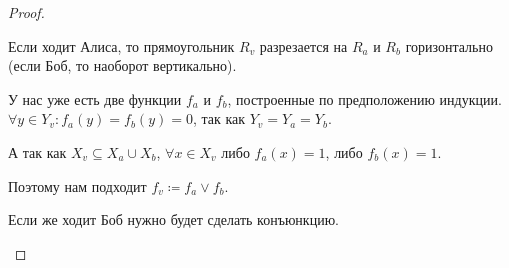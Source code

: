 \begin{proof}
\begin{description}
\begin{itemize}
					Если ходит Алиса, то прямоугольник  $ R_v$ разрезается на   $ R_a$ и  $ R_b$ горизонтально (если  Боб, то наоборот вертикально).

					У нас уже есть две функции  $ f_a$ и  $ f_b$, построенные по предположению индукции.  $ \forall y \in Y_v\colon  f_a(y) = f_b(y) = 0$, так как $ Y_v = Y_a = Y_b$.

					А так как $ X_v \subseteq X_a \cup X_b$, $ \forall x \in X_v$ либо $ f_a(x) = 1$, либо  $ f_b(x) = 1$.

					Поэтому нам подходит  $ f_v \coloneqq f_a \vee f_b$.

					Если же ходит Боб нужно будет сделать конъюнкцию.
			\end{itemize}
    \end{description} 
\end{proof}



